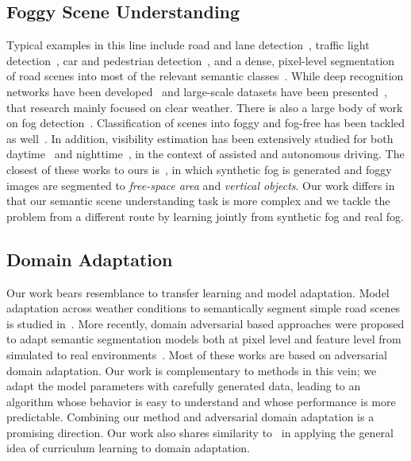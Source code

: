 \documentclass[twocolumn]{svjour3}          \smartqed  \usepackage{graphicx}
\begin{document}
\subsection{Foggy Scene Understanding}
Typical examples in this line include road and lane detection~\cite{recent:progress:lane}, traffic light detection~\cite{traffic:light:survey:16}, car and pedestrian detection~\cite{kitti}, and a dense, pixel-level segmentation of road scenes into most of the relevant semantic classes~\cite{recognition:sfm:eccv08,Cityscapes}. While deep recognition networks have been developed~\cite{dilated:convolution,refinenet,pspnet,fast:rcnn,faster:rcnn} and large-scale datasets have been presented~\cite{kitti,Cityscapes}, that research mainly focused on clear weather. There is also a large body of work on fog detection~\cite{fog:detection:cv:09,fog:detection:vehicles:12,night:fog:detection,fast:fog:detection}. Classification of scenes into foggy and fog-free has been tackled as well~\cite{fog:nonfog:classification:13}. In addition, visibility estimation has been extensively studied for both daytime~\cite{visibility:road:fog:10,visibility:detection:fog:15,fog:detection:visibility:distance} and nighttime~\cite{night:visibility:analysis:15}, in the context of assisted and autonomous driving. The closest of these works to ours is~\cite{visibility:road:fog:10}, in which synthetic fog is generated and foggy images are segmented to \emph{free-space area} and \emph{vertical objects}. Our work differs in that our semantic scene understanding task is more complex and we tackle the problem from a different route by learning jointly from synthetic fog and real fog.

\subsection{Domain Adaptation}
Our work bears resemblance to transfer learning and model adaptation. Model adaptation across weather conditions to semantically segment simple road scenes is studied in~\cite{road:scene:2013}. More recently, domain adversarial based approaches were proposed to adapt semantic segmentation models both at pixel level and feature level from simulated to real environments~\cite{adversarial:training:simulated:17,synthetic:semantic:segmentation,CyCADA,incremental:adversarial:DA:18}. 
Most of these works are based on adversarial domain adaptation. Our work is complementary to methods in this vein; we adapt the model parameters with carefully generated data, leading to an algorithm whose behavior is easy to understand and whose performance is more predictable. Combining our method and adversarial domain adaptation is a promising direction.  Our work also shares similarity to~\cite{curriculum:domain:adaptation:17} in applying the general idea of curriculum learning to domain adaptation. 
\end{document}
